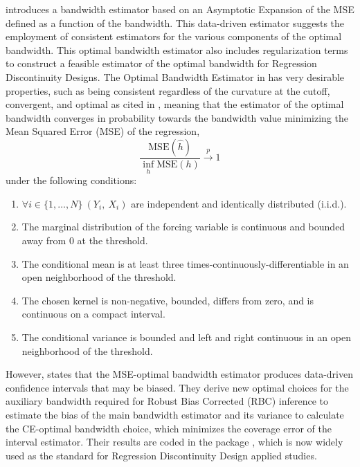 \documentclass[12pt]{article}
\theoremstyle{plain}
\theoremstyle{remark}
\begin{document}
\textcite{Imbens2012} introduces a bandwidth estimator based on an Asymptotic Expansion of the MSE defined as a function of the bandwidth. This data-driven estimator suggests the employment of consistent estimators for the various components of the optimal bandwidth. This optimal bandwidth estimator also includes regularization terms to construct a feasible estimator of the optimal bandwidth for Regression Discontinuity Designs. The Optimal Bandwidth Estimator in \textcite{Imbens2012} has very desirable properties, such as being consistent regardless of the curvature at the cutoff, convergent, and optimal as cited in \cite{Li1987}, meaning that the estimator of the optimal bandwidth converges in probability towards the bandwidth value minimizing the Mean Squared Error (MSE) of the regression,
\[ \frac{\text{MSE}(\hat{h})}{\inf_{h}\text{MSE}(h)} \overset{p}{\to} 1\]
under the following conditions:
\begin{enumerate}
    \item  $\forall i\in \{1,…,N\}\ \left( Y_i,\ X_i\right)$ are independent and identically distributed (i.i.d.).
    \item The marginal distribution of the forcing variable is continuous and bounded away from 0 at the threshold.
    \item The conditional mean is at least three times-continuously-differentiable in an open neighborhood of the threshold.
    \item The chosen kernel is non-negative, bounded, differs from zero, and is continuous on a compact interval.
    \item The conditional variance is bounded and left and right continuous in an open neighborhood of the threshold.
\end{enumerate}

However, \textcite{Calonico2014Robust} states that the MSE-optimal bandwidth estimator produces data-driven confidence intervals that may be biased. They derive new optimal choices for the auxiliary bandwidth required for Robust Bias Corrected (RBC) inference to estimate the bias of the main bandwidth estimator and its variance to calculate the CE-optimal bandwidth choice, which minimizes the coverage error of the interval estimator. Their results are coded in the package \textcite{Calonico2015}, which is now widely used as the standard for Regression Discontinuity Design applied studies.
\end{document}

